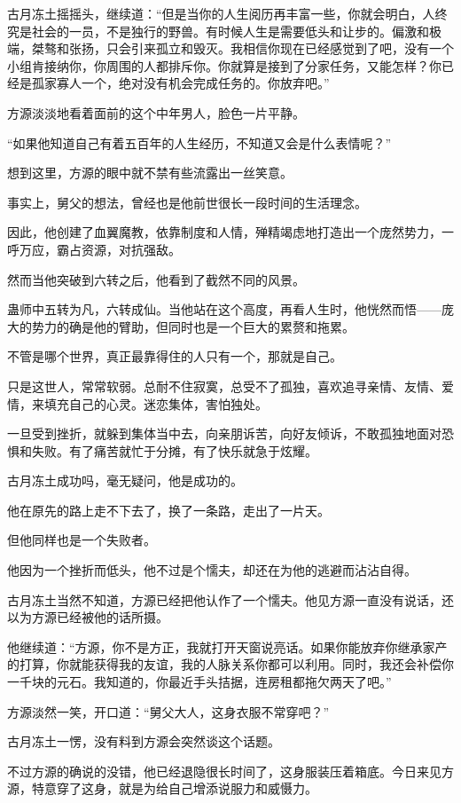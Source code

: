 \begin{this_body}
古月冻土摇摇头，继续道：“但是当你的人生阅历再丰富一些，你就会明白，人终究是社会的一员，不是独行的野兽。有时候人生是需要低头和让步的。偏激和极端，桀骜和张扬，只会引来孤立和毁灭。我相信你现在已经感觉到了吧，没有一个小组肯接纳你，你周围的人都排斥你。你就算是接到了分家任务，又能怎样？你已经是孤家寡人一个，绝对没有机会完成任务的。你放弃吧。”

方源淡淡地看着面前的这个中年男人，脸色一片平静。

“如果他知道自己有着五百年的人生经历，不知道又会是什么表情呢？”

想到这里，方源的眼中就不禁有些流露出一丝笑意。

事实上，舅父的想法，曾经也是他前世很长一段时间的生活理念。

因此，他创建了血翼魔教，依靠制度和人情，殚精竭虑地打造出一个庞然势力，一呼万应，霸占资源，对抗强敌。

然而当他突破到六转之后，他看到了截然不同的风景。

蛊师中五转为凡，六转成仙。当他站在这个高度，再看人生时，他恍然而悟——庞大的势力的确是他的臂助，但同时也是一个巨大的累赘和拖累。

不管是哪个世界，真正最靠得住的人只有一个，那就是自己。

只是这世人，常常软弱。总耐不住寂寞，总受不了孤独，喜欢追寻亲情、友情、爱情，来填充自己的心灵。迷恋集体，害怕独处。

一旦受到挫折，就躲到集体当中去，向亲朋诉苦，向好友倾诉，不敢孤独地面对恐惧和失败。有了痛苦就忙于分摊，有了快乐就急于炫耀。

古月冻土成功吗，毫无疑问，他是成功的。

他在原先的路上走不下去了，换了一条路，走出了一片天。

但他同样也是一个失败者。

他因为一个挫折而低头，他不过是个懦夫，却还在为他的逃避而沾沾自得。

古月冻土当然不知道，方源已经把他认作了一个懦夫。他见方源一直没有说话，还以为方源已经被他的话所摄。

他继续道：“方源，你不是方正，我就打开天窗说亮话。如果你能放弃你继承家产的打算，你就能获得我的友谊，我的人脉关系你都可以利用。同时，我还会补偿你一千块的元石。我知道的，你最近手头拮据，连房租都拖欠两天了吧。”

方源淡然一笑，开口道：“舅父大人，这身衣服不常穿吧？”

古月冻土一愣，没有料到方源会突然谈这个话题。

不过方源的确说的没错，他已经退隐很长时间了，这身服装压着箱底。今日来见方源，特意穿了这身，就是为给自己增添说服力和威慑力。


\end{this_body}
